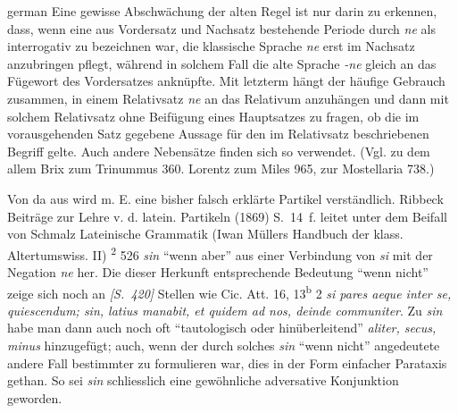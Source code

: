 \begin{otherlanguage*}{german}
Eine gewisse Abschwächung der alten Regel ist nur darin zu erkennen, dass, wenn eine aus Vordersatz und Nachsatz bestehende Periode durch \emph{ne} als interrogativ zu bezeichnen war, die klassische Sprache \emph{ne} erst im Nachsatz anzubringen pflegt, während in solchem Fall die alte Sprache \emph{-ne} gleich an das Fügewort des Vordersatzes anknüpfte. Mit letzterm hängt der häufige Gebrauch zusammen, in einem Relativsatz \emph{ne} an das Relativum anzuhängen und dann mit solchem Relativsatz ohne Beifügung eines Hauptsatzes zu fragen, ob die im vorausgehenden Satz gegebene Aussage für den im Relativsatz beschriebenen Begriff gelte. Auch andere Nebensätze finden sich so verwendet. (Vgl. zu dem allem Brix zum Trinummus 360. Lorentz zum Miles 965, zur Mostellaria 738.)

Von da aus wird m. E. eine bisher falsch erklärte Partikel verständlich. Ribbeck Beiträge zur Lehre v. d. latein. Partikeln (1869) S.~14~f. leitet unter dem Beifall von Schmalz Lateinische Grammatik (Iwan Müllers Handbuch der klass. Altertumswiss. II) \textsuperscript{2} 526 \emph{sin} “wenn aber” aus einer Verbindung von \emph{si} mit der Negation \emph{ne} her. Die dieser Herkunft entsprechende Bedeutung “wenn nicht” zeige sich noch an \hypertarget{p420}{\emph{[S.~420]}}\label{p420} Stellen wie Cic. Att. 16, 13\textsuperscript{b} 2 \emph{si pares aeque inter se, quiescendum; sin, latius manabit, et quidem ad nos, deinde communiter}. Zu \emph{sin} habe man dann auch noch oft “tautologisch oder hinüberleitend” \emph{aliter, secus, minus} hinzugefügt; auch, wenn der durch solches \emph{sin} “wenn nicht” angedeutete andere Fall bestimmter zu formulieren war, dies in der Form einfacher Parataxis gethan. So sei \emph{sin} schliesslich eine gewöhnliche adversative Konjunktion geworden.


\end{otherlanguage*}
